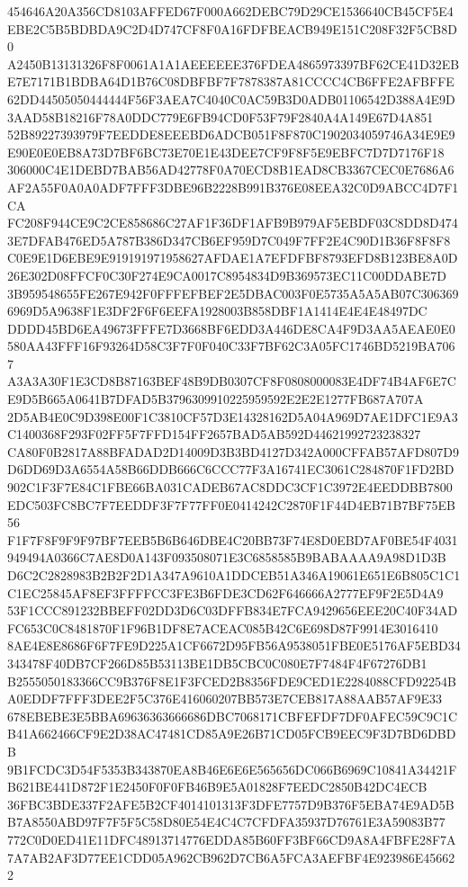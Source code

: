 \documentclass[UTF8,fontset=fandol,zihao=-4,a4paper]{ctexart}
\begin{document}
{{454646A20A356CD8103AFFED67F000A662DEBC79D29CE1536640CB45CF5E4EBE2C5B5BDBDA9C2D4D747CF8F0A16FDFBEACB949E151C208F32F5CB8D0
A2450B13131326F8F0061A1A1AEEEEEE376FDEA4865973397BF62CE41D32EBE7E7171B1BDBA64D1B76C08DBFBF7F7878387A81CCCC4CB6FFE2AFBFFE
62DD44505050444444F56F3AEA7C4040C0AC59B3D0ADB01106542D388A4E9D3AAD58B18216F78A0DDC779E6FB94CD0F53F79F2840A4A149E67D4A851
52B89227393979F7EEDDE8EEEBD6ADCB051F8F870C1902034059746A34E9E9E90E0E0EB8A73D7BF6BC73E70E1E43DEE7CF9F8F5E9EBFC7D7D7176F18
306000C4E1DEBD7BAB56AD42778F0A70ECD8B1EAD8CB3367CEC0E7686A6AF2A55F0A0A0ADF7FFF3DBE96B2228B991B376E08EEA32C0D9ABCC4D7F1CA
FC208F944CE9C2CE858686C27AF1F36DF1AFB9B979AF5EBDF03C8DD8D4743E7DFAB476ED5A787B386D347CB6EF959D7C049F7FF2E4C90D1B36F8F8F8
C0E9E1D6EBE9E919191971958627AFDAE1A7EFDFBF8793EFD8B123BE8A0D26E302D08FFCF0C30F274E9CA0017C8954834D9B369573EC11C00DDABE7D
3B959548655FE267E942F0FFFEFBEF2E5DBAC003F0E5735A5A5AB07C3063696969D5A9638F1E3DF2F6F6EEFA1928003B858DBF1A1414E4E4E48497DC
DDDD45BD6EA49673FFFE7D3668BF6EDD3A446DE8CA4F9D3AA5AEAE0E0580AA43FFF16F93264D58C3F7F0F040C33F7BF62C3A05FC1746BD5219BA7067
A3A3A30F1E3CD8B87163BEF48B9DB0307CF8F0808000083E4DF74B4AF6E7CE9D5B665A0641B7DFAD5B3796309910225959592E2E2E1277FB687A707A
2D5AB4E0C9D398E00F1C3810CF57D3E14328162D5A04A969D7AE1DFC1E9A3C1400368F293F02FF5F7FFD154FF2657BAD5AB592D44621992723238327
CA80F0B2817A88BFADAD2D14009D3B3BD4127D342A000CFFAB57AFD807D9D6DD69D3A6554A58B66DDB666C6CCC77F3A16741EC3061C284870F1FD2BD
902C1F3F7E84C1FBE66BA031CADEB67AC8DDC3CF1C3972E4EEDDBB7800EDC503FC8BC7F7EEDDF3F7F77FF0E0414242C2870F1F44D4EB71B7BF75EB56
F1F7F8F9F9F97BF7EEB5B6B646DBE4C20BB73F74E8D0EBD7AF0BE54F4031949494A0366C7AE8D0A143F093508071E3C6858585B9BABAAAA9A98D1D3B
D6C2C2828983B2B2F2D1A347A9610A1DDCEB51A346A19061E651E6B805C1C1C1EC25845AF8EF3FFFFCC3FE3B6FDE3CD62F646666A2777EF9F2E5D4A9
53F1CCC891232BBEFF02DD3D6C03DFFB834E7FCA9429656EEE20C40F34ADFC653C0C8481870F1F96B1DF8E7ACEAC085B42C6E698D87F9914E3016410
8AE4E8E8686F6F7FE9D225A1CF6672D95FB56A9538051FBE0E5176AF5EBD34343478F40DB7CF266D85B53113BE1DB5CBC0C080E7F7484F4F67276DB1
B2555050183366CC9B376F8E1F3FCED2B8356FDE9CED1E2284088CFD92254BA0EDDF7FFF3DEE2F5C376E416060207BB573E7CEB817A88AAB57AF9E33
678EBEBE3E5BBA69636363666686DBC7068171CBFEFDF7DF0AFEC59C9C1CB41A662466CF9E2D38AC47481CD85A9E26B71CD05FCB9EEC9F3D7BD6DBDB
9B1FCDC3D54F5353B343870EA8B46E6E6E565656DC066B6969C10841A34421FB621BE441D872F1E2450F0F0FB46B9E5A01828F7EEDC2850B42DC4ECB
36FBC3BDE337F2AFE5B2CF4014101313F3DFE7757D9B376F5EBA74E9AD5BB7A8550ABD97F7F5F5C58D80E54E4C4C7CFDFA35937D76761E3A59083B77
772C0D0ED41E11DFC48913714776EDDA85B60FF3BF66CD9A8A4FBFE28F7A7A7AB2AF3D77EE1CDD05A962CB962D7CB6A5FCA3AEFBF4E923986E456622
}}
\end{document}
